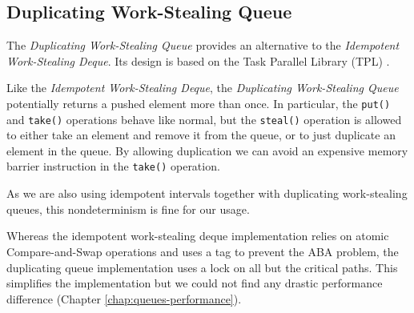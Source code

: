 \subsection{Duplicating Work-Stealing Queue}
\label{sec:queues-alternative-implementations-duplicating-queue}

The \emph{Duplicating Work-Stealing Queue} provides an alternative to
the \emph{Idempotent Work-Stealing Deque}. Its design is based on the
Task Parallel Library (TPL) \cite{Leijen2009}.

Like the \emph{Idempotent Work-Stealing Deque}, the \emph{Duplicating
  Work-Stealing Queue} potentially returns a pushed element more than
once. In particular, the \lstinline!put()!  and \lstinline!take()!
operations behave like normal, but the \lstinline!steal()! operation
is allowed to either take an element and remove it from the queue, or
to just duplicate an element in the queue. By allowing duplication we
can avoid an expensive memory barrier instruction in the
\lstinline!take()! operation.

As we are also using idempotent intervals together with duplicating
work-stealing queues, this nondeterminism is fine for our usage.

Whereas the idempotent work-stealing deque implementation relies on
atomic Compare-and-Swap operations and uses a tag to prevent the ABA
problem, the duplicating queue implementation uses a lock on all but
the critical paths. This simplifies the implementation but we could
not find any drastic performance difference (Chapter
\ref{chap:queues-performance}).


